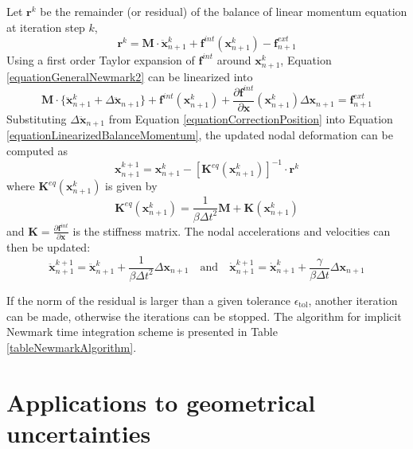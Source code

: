 \documentclass[oneside,11pt,times]{book}
\begin{document}
Let $\bm{r}^{k}$ be the remainder (or residual) of the balance of linear momentum equation at iteration step $k$,
%
\begin{equation} \label{equationResidualMomentum}
 \bm{r}^{k} = \bm{M} \cdot \ddot{\bm{x}}^{k}_{n+1} + \bm{f}^{int}(\bm{x}^{k}_{n+1}) -
 \bm{f}^{ext}_{n+1}
\end{equation}
%
Using a first order Taylor expansion of $\bm{f}^{int}$ around $\bm{x}^{k}_{n+1}$, Equation \eqref{equationGeneralNewmark2} can be linearized into
%
\begin{equation} \label{equationLinearizedBalanceMomentum}
 \bm{M} \cdot \{\ddot{\bm{x}}^{k}_{n+1} + \Delta \ddot{\bm{x}}_{n+1}\} + \bm{f}^{int}
 (\bm{x}^{k}_{n+1}) + \frac{\partial \bm{f}^{int}}{\partial \bm{x}}(\bm{x}^{k}_{n+1})
 \Delta \bm{x}_{n+1} = \bm{f}^{ext}_{n+1}
\end{equation}
%
Substituting $\Delta \ddot{\bm{x}}_{n+1}$ from Equation \eqref{equationCorrectionPosition} into Equation \eqref{equationLinearizedBalanceMomentum}, the updated nodal deformation can be computed as
%
\begin{equation} \label{equationUpdatedPosition}
 \bm{x}^{k+1}_{n+1} = \bm{x}^{k}_{n+1} - [\bm{K}^{eq}(\bm{x}^{k}_{n+1})]^{-1} \cdot \bm{r}^{k}
\end{equation}
%
where $\bm{K}^{eq}(\bm{x}^{k}_{n+1})$ is given by
%
\begin{equation} \label{equationJacobianMatrix}
 \bm{K}^{eq}(\bm{x}^{k}_{n+1}) = \frac{1}{\beta \Delta t^2} \bm{M} + \bm{K} (\bm{x}^{k}_{n+1})
\end{equation}
%
and $\bm{K} = \frac{\partial \bm{f}^{int}}{\partial \bm{x}}$ is the stiffness matrix. The nodal accelerations and velocities can then be updated:
%
\begin{equation} \label{equationUpdatedAccelerationVelocity}
 \ddot{\bm{x}}^{k+1}_{n+1} = \ddot{\bm{x}}^{k}_{n+1} + \frac{1}{\beta \Delta t^2} \Delta
 \bm{x}_{n+1} \quad \textrm{and} \quad  \dot{\bm{x}}^{k+1}_{n+1} = \dot{\bm{x}}^{k}_{n+1} +
 \frac{\gamma}{\beta \Delta t} \Delta \bm{x}_{n+1}
\end{equation}

If the norm of the residual is larger than a given tolerance $\epsilon_{\textrm{tol}}$, another iteration can be made, otherwise the iterations can be stopped. The algorithm for implicit Newmark time integration scheme is presented in Table \ref{tableNewmarkAlgorithm}.
%

\section{Applications to geometrical uncertainties}
\end{document}
